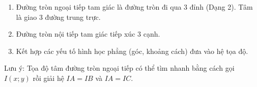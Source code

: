 \begin{enumerate}
\item Đường tròn ngoại tiếp tam giác là đường tròn đi qua $3$ đỉnh (Dạng 2). Tâm là giao $3$ đường trung trực.
\item Đường tròn nội tiếp tam giác tiếp xúc $3$ cạnh.
\item Kết hợp các yếu tố hình học phẳng (góc, khoảng cách) đưa vào hệ tọa độ.
\end{enumerate}
Lưu ý: Tọa độ tâm đường tròn ngoại tiếp có thể tìm nhanh bằng cách gọi $I(x; y)$ rồi giải hệ $IA = IB$ và $IA = IC$.
